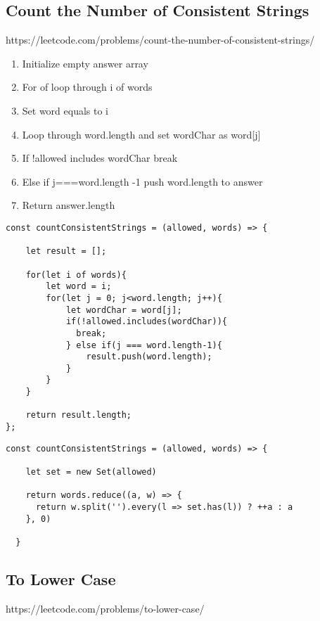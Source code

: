 \documentclass[10pt]{article}
\begin{document}
\pagebreak %
\medskip 
\subsection{Count the Number of Consistent Strings}
https://leetcode.com/problems/count-the-number-of-consistent-strings/

\begin{enumerate}
	\item Initialize empty answer array 
	\item For of loop through i of words
	\item Set word equals to i 
	\item Loop through word.length and set wordChar as word[j]
	\item If !allowed includes wordChar break
	\item Else if j===word.length -1 push word.length to answer
	\item Return answer.length
\end{enumerate}

\begin{lstlisting}[title=Solution countConsistentStrings with loops, captionpos=t]
const countConsistentStrings = (allowed, words) => {
    
    let result = [];
    
    for(let i of words){
        let word = i;
        for(let j = 0; j<word.length; j++){
            let wordChar = word[j];
            if(!allowed.includes(wordChar)){
              break;
            } else if(j === word.length-1){
                result.push(word.length);
            }
        }
    }
    
    return result.length;
};
\end{lstlisting}

\begin{lstlisting}[title=Solution countConsistentStrings ES6, captionpos=t]
const countConsistentStrings = (allowed, words) => {

    let set = new Set(allowed)
    
    return words.reduce((a, w) => {
      return w.split('').every(l => set.has(l)) ? ++a : a
    }, 0)
    
  }
\end{lstlisting}
\medskip %





\pagebreak %
\medskip 
\subsection{To Lower Case}
https://leetcode.com/problems/to-lower-case/
\end{document}
